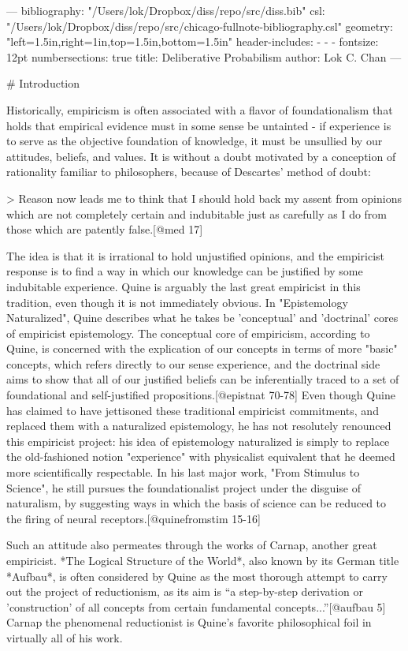 --- bibliography: "/Users/lok/Dropbox/diss/repo/src/diss.bib" csl:
"/Users/lok/Dropbox/diss/repo/src/chicago-fullnote-bibliography.csl"
geometry: "left=1.5in,right=1in,top=1.5in,bottom=1.5in" header-includes:
- - - fontsize: 12pt numbersections: true title: Deliberative
Probabilism author: Lok C. Chan ---

\# Introduction

Historically, empiricism is often associated with a flavor of
foundationalism that holds that empirical evidence must in some sense be
untainted - if experience is to serve as the objective foundation of
knowledge, it must be unsullied by our attitudes, beliefs, and values.
It is without a doubt motivated by a conception of rationality familiar
to philosophers, because of Descartes' method of doubt:

\textgreater{} Reason now leads me to think that I should hold back my
assent from opinions which are not completely certain and indubitable
just as carefully as I do from those which are patently false.{[}@med
17{]}

The idea is that it is irrational to hold unjustified opinions, and the
empiricist response is to find a way in which our knowledge can be
justified by some indubitable experience. Quine is arguably the last
great empiricist in this tradition, even though it is not immediately
obvious. In "Epistemology Naturalized", Quine describes what he takes be
'conceptual' and 'doctrinal' cores of empiricist epistemology. The
conceptual core of empiricism, according to Quine, is concerned with the
explication of our concepts in terms of more "basic" concepts, which
refers directly to our sense experience, and the doctrinal side aims to
show that all of our justified beliefs can be inferentially traced to a
set of foundational and self-justified propositions.{[}@epistnat
70-78{]} Even though Quine has claimed to have jettisoned these
traditional empiricist commitments, and replaced them with a naturalized
epistemology, he has not resolutely renounced this empiricist project:
his idea of epistemology naturalized is simply to replace the
old-fashioned notion "experience" with physicalist equivalent that he
deemed more scientifically respectable. In his last major work, "From
Stimulus to Science", he still pursues the foundationalist project under
the disguise of naturalism, by suggesting ways in which the basis of
science can be reduced to the firing of neural
receptors.{[}@quinefromstim 15-16{]}

Such an attitude also permeates through the works of Carnap, another
great empiricist. *The Logical Structure of the World*, also known by
its German title *Aufbau*, is often considered by Quine as the most
thorough attempt to carry out the project of reductionism, as its aim is
``a step-by-step derivation or 'construction' of all concepts from
certain fundamental concepts...''{[}@aufbau 5{]} Carnap the phenomenal
reductionist is Quine's favorite philosophical foil in virtually all of
his work.

